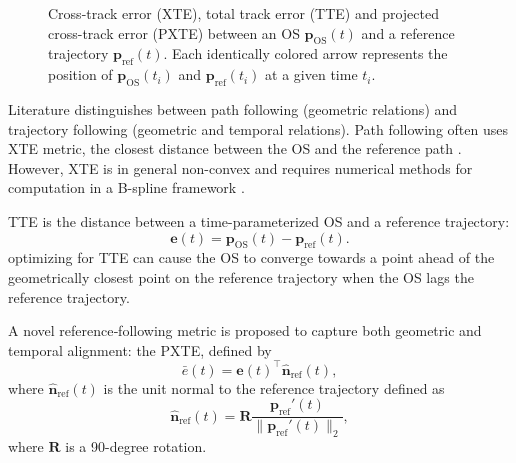 \begin{figure}
    \centering
    
    \caption{Cross-track error (XTE), total track error (TTE) and projected cross-track error (PXTE) between an OS $\mathbf p_\text{OS}(t)$ and a reference trajectory $\mathbf p_\text{ref}(t)$. Each identically colored arrow represents the position of $\mathbf p_\text{OS}(t_i)$ and $\mathbf p_\text{ref}(t_i)$ at a given time $t_i$.}
    \label{fig:cross-track-along-track-error}
\end{figure}

Literature distinguishes between path following (geometric relations) and trajectory following (geometric and temporal relations). Path following often uses \acrfull{XTE} metric, the closest distance between the OS and the reference path \citep{Fossen2011-Handbook}. However, XTE is in general non-convex and requires numerical methods for computation in a B-spline framework \citep{johnson2005distance,hu2005second,chen2009computing}.

\acrfull{TTE} is the distance between a time-parameterized OS and a reference trajectory:
\begin{equation}\label{eq:total-track-error}
    \mathbf e(t) = \mathbf p_\text{OS}(t) - \mathbf p_\text{ref}(t).
\end{equation}
optimizing for TTE can cause the OS to converge towards a point ahead of the geometrically closest point on the reference trajectory when the OS lags the reference trajectory.

A novel reference‐following metric is proposed to capture both geometric and temporal alignment: the \acrfull{PXTE}, defined by
\begin{equation}\label{eq:pxte}
  \bar e(t)
  = \mathbf e(t)^\top \mathbf{\hat n}_{\mathrm{ref}}(t),
\end{equation}
where $\mathbf{\hat n}_{\mathrm{ref}}(t)$ is the unit normal to the reference trajectory defined as 
\begin{equation}\label{eq:reference-normal-2}
    \mathbf{\hat n}_{\mathrm{ref}}(t) = \mathbf R\frac{\mathbf p_\text{ref}'(t)}{\|\mathbf p_\text{ref}'(t)\|_2},
\end{equation}
where $\mathbf R$ is a 90-degree rotation. 

